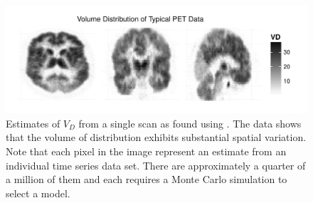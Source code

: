 \begin{figure}[t]
  \linespread{1.1}\selectfont
  \includegraphics[width=\linewidth]{fig_src/PETPlot-smc2-ps-bw}
  \caption[Volume of distribution of real \protect\pet compartmental model
  data]
  {Estimates of $V_D$ from a single \pet scan as found using \smc[2].
    The data shows that the volume of distribution exhibits substantial
    spatial variation. Note that each pixel in the image represent an estimate
    from an individual time series data set. There are approximately a quarter
    of a million of them and each requires a Monte Carlo simulation to select
    a model.}
  \label{fig:petplot}
\end{figure}
